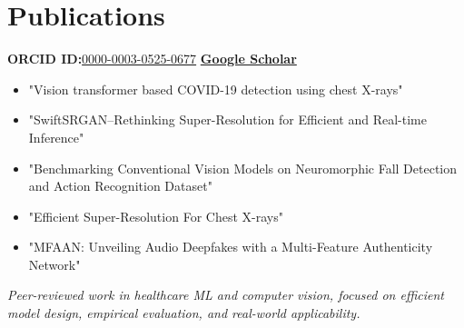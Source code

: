\documentclass[11pt,a4paper,sans]{moderncv}
\begin{document}
\section{Publications}
\setlength{\itemsep}{0pt} %
\setlength{\parskip}{0pt} %
\textbf{ORCID ID:}\href{https://orcid.org/0000-0003-0525-0677}{\textcolor{customblue}{0000-0003-0525-0677}} \textbar{} \href{https://scholar.google.ca/citations?hl=en&user=lDmjJtoAAAAJ}{\textbf{Google Scholar}}
\begin{itemize}[leftmargin=0.6cm, label={\textbullet}]
	\item "Vision transformer based COVID-19 detection using chest X-rays"
    \vspace{-4pt}
	\item "SwiftSRGAN--Rethinking Super-Resolution for Efficient and Real-time Inference"
    \vspace{-4pt}
	\item "Benchmarking Conventional Vision Models on Neuromorphic Fall Detection and Action Recognition Dataset"
    \vspace{-4pt}
	\item "Efficient Super-Resolution For Chest X-rays"
    \vspace{-4pt}
	\item "MFAAN: Unveiling Audio Deepfakes with a Multi-Feature Authenticity Network"
\end{itemize}
\textit{Peer-reviewed work in healthcare ML and computer vision, focused on efficient model design, empirical evaluation, and real-world applicability.}

\end{document}
